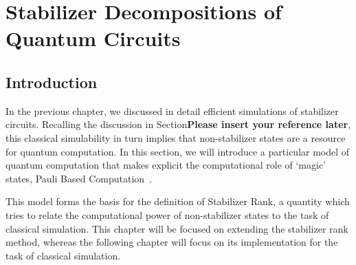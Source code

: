 
\chapter{Stabilizer Decompositions of Quantum Circuits}
\label{chap:stabrank}

\section{Introduction}
In the previous chapter, we discussed in detail efficient simulations of stabilizer circuits. Recalling the discussion in Section\textbf{Please insert your reference later}, this classical simulability in turn implies that non-stabilizer states are a resource for quantum computation. In this section, we will introduce a particular model of quantum computation that makes explicit the computational role of `magic' states, Pauli Based Computation~\cite{Bravyi2015,Yoganathan2019}.\par
This model forms the basis for the definition of Stabilizer Rank, a quantity which tries to relate the computational power of non-stabilizer states to the task of classical simulation. This chapter will be focused on extending the stabilizer rank method, whereas the following chapter will focus on its implementation for the task of classical simulation.
